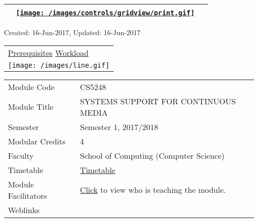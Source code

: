 \hypertarget{ctl00_ctl00_ContentPlaceHolder1_ContentPlaceHolder1_UP}{}
\hypertarget{contentstart}{}
\hypertarget{ctl00_ctl00_ContentPlaceHolder1_ContentPlaceHolder1_pnlMain}{}
\begin{longtable}[]{@{}ll@{}}
\toprule
&
{\href{javascript:PrintThisPage();}{\texttt{[image: /images/controls/gridview/print.gif]}}~~}\tabularnewline
\bottomrule
\end{longtable}

\protect\hypertarget{ctl00_ctl00_ContentPlaceHolder1_ContentPlaceHolder1_LV_UpdateInfo_ctrl0_txtDate}{}{Created:
16-Jun-2017, Updated: 16-Jun-2017}

\begin{longtable}[]{@{}l@{}}
\toprule
\protect\hypertarget{ctl00_ctl00_ContentPlaceHolder1_ContentPlaceHolder1_lblSectionTop}{}{\protect\hyperlink{Prerequisites}{Prerequisites}
\textbar{} \protect\hyperlink{Workload}{Workload}}\tabularnewline
\texttt{[image: /images/line.gif]}\tabularnewline
\bottomrule
\end{longtable}

\hypertarget{ctl00_ctl00_ContentPlaceHolder1_ContentPlaceHolder1_LV_itemPlaceholderContainer}{}
\begin{longtable}[]{@{}ll@{}}
\toprule
\protect\hypertarget{ctl00_ctl00_ContentPlaceHolder1_ContentPlaceHolder1_LV_ctrl0_txtCode}{}{Module
Code} &
\protect\hypertarget{ctl00_ctl00_ContentPlaceHolder1_ContentPlaceHolder1_LV_ctrl0_lcCode}{}{CS5248}\tabularnewline
\protect\hypertarget{ctl00_ctl00_ContentPlaceHolder1_ContentPlaceHolder1_LV_ctrl0_lcCourse}{}{Module
Title} &
\protect\hypertarget{ctl00_ctl00_ContentPlaceHolder1_ContentPlaceHolder1_LV_ctrl0_lcCourseName}{}{SYSTEMS
SUPPORT FOR CONTINUOUS MEDIA}\tabularnewline
\protect\hypertarget{ctl00_ctl00_ContentPlaceHolder1_ContentPlaceHolder1_LV_ctrl0_lcSemester}{}{Semester}
&
\protect\hypertarget{ctl00_ctl00_ContentPlaceHolder1_ContentPlaceHolder1_LV_ctrl0_lcSem}{}{Semester
1, 2017/2018}\tabularnewline
\protect\hypertarget{ctl00_ctl00_ContentPlaceHolder1_ContentPlaceHolder1_LV_ctrl0_lcModCredit}{}{Modular
Credits} &
\protect\hypertarget{ctl00_ctl00_ContentPlaceHolder1_ContentPlaceHolder1_LV_ctrl0_lcModC}{}{4}\tabularnewline
\protect\hypertarget{ctl00_ctl00_ContentPlaceHolder1_ContentPlaceHolder1_LV_ctrl0_lcFaculty}{}{Faculty}
&
\protect\hypertarget{ctl00_ctl00_ContentPlaceHolder1_ContentPlaceHolder1_LV_ctrl0_lcFac}{}{School
of Computing (Computer Science)}\tabularnewline
\protect\hypertarget{ctl00_ctl00_ContentPlaceHolder1_ContentPlaceHolder1_LV_ctrl0_Label1}{}{Timetable}
&
\protect\hypertarget{ctl00_ctl00_ContentPlaceHolder1_ContentPlaceHolder1_LV_ctrl0_Span1}{}{\href{javascript:void(0);}{Timetable}}\tabularnewline
\protect\hypertarget{ctl00_ctl00_ContentPlaceHolder1_ContentPlaceHolder1_LV_ctrl0_Label6}{}{Module
Facilitators} &
\protect\hypertarget{ctl00_ctl00_ContentPlaceHolder1_ContentPlaceHolder1_LV_ctrl0_Span2}{}{\href{list_lecturers.aspx?CourseID=7513b853-f1d9-438e-beaf-f187a9d75990\&ClickFrom=}{Click}
to view who is teaching the module.}\tabularnewline
\protect\hypertarget{ctl00_ctl00_ContentPlaceHolder1_ContentPlaceHolder1_LV_ctrl0_LabelCtrl1}{}{Weblinks}
&\tabularnewline
\bottomrule
\end{longtable}

